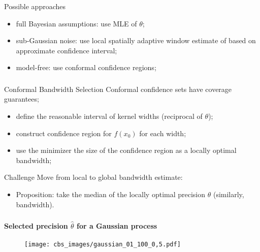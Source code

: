 \documentclass[t]{beamer}  %
\begin{document}
\begin{frame}[c]\frametitle{\insertsection}
  \framesubtitle{\insertsubsection}
  \begin{block}{Possible approaches}
  \begin{itemize}
    \item full Bayesian assumptions: use MLE of $\theta$;
    \item sub-Gaussian noise: use local spatially adaptive window estimate of
      \cite{goldenshluger1997} based on approximate confidence interval;
    \item model-free: use conformal confidence regions;
  \end{itemize}
  \end{block}
\end{frame}

\begin{frame}[c]\frametitle{\insertsection}
  \framesubtitle{\insertsubsection}
  \begin{block}{Conformal Bandwidth Selection}
    Conformal confidence sets have coverage guarantees;
    \begin{itemize}
      \item define the reasonable interval of kernel widths (reciprocal of $\theta$);
      \item construct confidence region for $f(x_0)$ for each width;
      \item use the minimizer the size of the confidence region as a locally optimal
      bandwidth;
    \end{itemize}
  \end{block}

  \vspace{\baselineskip}
  \begin{block}{Challenge}
    Move from local to global bandwidth estimate: \begin{itemize}
      \item Proposition: take the median of the locally optimal precision
      $\theta$ (similarly, bandwidth).
    \end{itemize}
  \end{block}
\end{frame}

\begin{frame}[t]\frametitle{\insertsection}
  \framesubtitle{Selected precision $\hat{\theta}$ for a Gaussian process}
  \begin{figure}%
    \centering
    \texttt{[image: cbs\_images/gaussian\_01\_100\_0,5.pdf]}
  \end{figure}
\end{frame}
\end{document}
